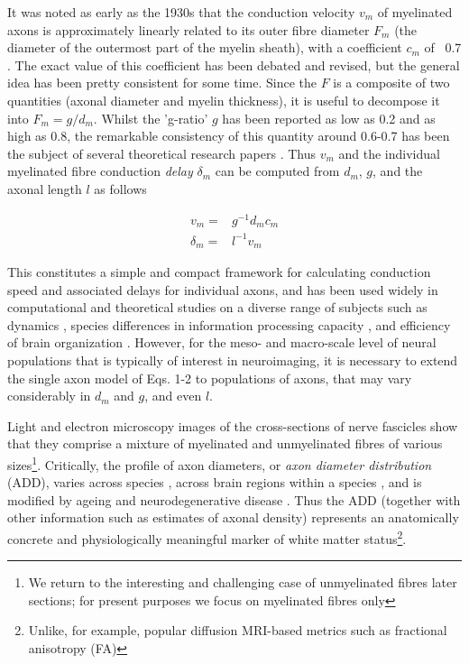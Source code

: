 It was noted as early as the 1930s that the conduction velocity $v_m$ of myelinated axons is approximately linearly related to its outer fibre diameter $F_m$ (the diameter of the outermost part of the myelin sheath), with a coefficient $c_m$ of ~0.7  . The exact value of this coefficient has been debated and revised, but the general idea has been pretty consistent for some time. Since the $F$ is a composite of two quantities (axonal diameter and myelin thickness), it is useful to decompose it into $F_m = g/d_m$. Whilst the 'g-ratio' $g$ has been reported as low as 0.2 and as high as 0.8, the remarkable consistency of this quantity around 0.6-0.7 has been the subject of several theoretical research papers 
. Thus $v_m$ and the individual myelinated fibre conduction \textit{delay} $\delta_m$ can be computed from $d_m$, $g$, and the axonal length $l$ as follows

\begin{eqnarray}
v_m      =& g^{-1} d_m c_m \\
\delta_m =& l^{-1} v_m
\end{eqnarray}




This constitutes a simple and compact framework for calculating conduction speed and associated delays for individual axons, and has been used widely in computational and theoretical studies on a diverse range of subjects such as dynamics , species differences in information processing capacity \cite{caminiti2009evolution}, and efficiency of brain organization . However, for the meso- and macro-scale level of neural populations that is typically of interest in neuroimaging, it is necessary to extend the single axon model of Eqs. 1-2 to  populations of axons, that may vary considerably in $d_m$ and $g$, and even $l$. 

Light and electron microscopy images of the cross-sections of nerve fascicles show that they comprise a mixture of myelinated and unmyelinated fibres of various sizes\footnote{We return to the interesting and challenging case of unmyelinated fibres later sections; for present purposes we focus on myelinated fibres only}. Critically, the profile of axon diameters, or \textit{axon diameter distribution} (ADD), varies across species , across brain regions within a species , and is modified by ageing and neurodegenerative disease . Thus the ADD (together with other information such as estimates of axonal density) represents an anatomically concrete and physiologically meaningful marker of white matter status\footnote{Unlike, for example, popular diffusion MRI-based metrics such as fractional anisotropy (FA)}. 

